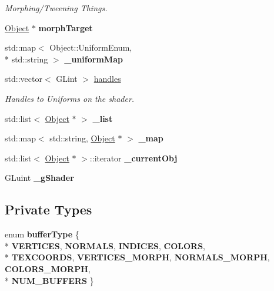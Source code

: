 \begin{DoxyCompactItemize}
\begin{DoxyCompactList}\small\item\em Morphing/\-Tweening Things. \end{DoxyCompactList}\item 
\hypertarget{class_object_acfc4dec49d5d273910c3a1af2b3adfcd}{\hyperlink{class_object}{Object} $\ast$ {\bfseries morph\-Target}}\label{class_object_acfc4dec49d5d273910c3a1af2b3adfcd}

\item 
\hypertarget{class_object_a6378d0b0eeec23045ae2a5245e42bf13}{std\-::map$<$ Object\-::\-Uniform\-Enum, \\*
std\-::string $>$ {\bfseries \-\_\-uniform\-Map}}\label{class_object_a6378d0b0eeec23045ae2a5245e42bf13}

\item 
std\-::vector$<$ G\-Lint $>$ \hyperlink{class_object_acd6c7021617ea334915a1525f9519bc5}{handles}
\begin{DoxyCompactList}\small\item\em Handles to Uniforms on the shader. \end{DoxyCompactList}\item 
\hypertarget{class_scene_acdd0123ca6b2d64d8d447bb485b235fc}{std\-::list$<$ \hyperlink{class_object}{Object} $\ast$ $>$ {\bfseries \-\_\-list}}\label{class_scene_acdd0123ca6b2d64d8d447bb485b235fc}

\item 
\hypertarget{class_scene_a8bd5d86484a12255b26b92b6cbf8d29a}{std\-::map$<$ std\-::string, \hyperlink{class_object}{Object} $\ast$ $>$ {\bfseries \-\_\-map}}\label{class_scene_a8bd5d86484a12255b26b92b6cbf8d29a}

\item 
\hypertarget{class_scene_ae87ca5350fcc595f3f15a4fd3c39f3d9}{std\-::list$<$ \hyperlink{class_object}{Object} $\ast$ $>$\-::iterator {\bfseries \-\_\-current\-Obj}}\label{class_scene_ae87ca5350fcc595f3f15a4fd3c39f3d9}

\item 
\hypertarget{class_scene_a8f9bdd8ec5edb1f414fbd314a36e2724}{G\-Luint {\bfseries \-\_\-g\-Shader}}\label{class_scene_a8f9bdd8ec5edb1f414fbd314a36e2724}

\end{DoxyCompactItemize}
\subsection*{Private Types}
\begin{DoxyCompactItemize}
\item 
enum {\bfseries buffer\-Type} \{ \\*
{\bfseries V\-E\-R\-T\-I\-C\-E\-S}, 
{\bfseries N\-O\-R\-M\-A\-L\-S}, 
{\bfseries I\-N\-D\-I\-C\-E\-S}, 
{\bfseries C\-O\-L\-O\-R\-S}, 
\\*
{\bfseries T\-E\-X\-C\-O\-O\-R\-D\-S}, 
{\bfseries V\-E\-R\-T\-I\-C\-E\-S\-\_\-\-M\-O\-R\-P\-H}, 
{\bfseries N\-O\-R\-M\-A\-L\-S\-\_\-\-M\-O\-R\-P\-H}, 
{\bfseries C\-O\-L\-O\-R\-S\-\_\-\-M\-O\-R\-P\-H}, 
\\*
{\bfseries N\-U\-M\-\_\-\-B\-U\-F\-F\-E\-R\-S}
 \}
\end{DoxyCompactItemize}


